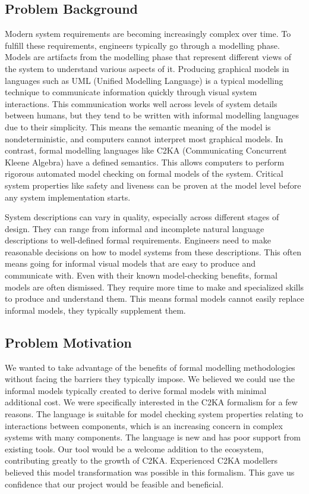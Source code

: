 \subsection{Problem Background}\label{subsec:problem-background}
Modern system requirements are becoming increasingly complex over time.
To fulfill these requirements, engineers typically go through a modelling phase.
Models are artifacts from the modelling phase that represent different views of the system to understand various aspects of it.
Producing graphical models in languages such as UML (Unified Modelling Language) is a typical modelling technique to communicate information quickly through visual system interactions.
This communication works well across levels of system details between humans,
but they tend to be written with informal modelling languages due to their simplicity.
This means the semantic meaning of the model is nondeterministic, and computers cannot interpret most graphical models.
In contrast, formal modelling languages like C2KA (Communicating Concurrent Kleene Algebra) have a defined semantics.
This allows computers to perform rigorous automated model checking on formal models of the system.
Critical system properties like safety and liveness can be proven at the model level before any system implementation starts.

System descriptions can vary in quality, especially across different stages of design.
They can range from informal and incomplete natural language descriptions
to well-defined formal requirements.
Engineers need to make reasonable decisions on how to model systems from these descriptions.
This often means going for informal visual models that are easy to produce and communicate with.
Even with their known model-checking benefits, formal models are often dismissed.
They require more time to make and specialized skills to produce and understand them.
This means formal models cannot easily replace informal models, they typically supplement them.

\subsection{Problem Motivation}\label{subsec:problem-motivation}
We wanted to take advantage of the benefits of formal modelling methodologies without facing the barriers they typically impose.
We believed we could use the informal models typically created to derive formal models with minimal additional cost.
We were specifically interested in the C2KA formalism for a few reasons.
The language is suitable for model checking system properties relating to interactions between components, which is an increasing concern in complex systems with many components.
The language is new and has poor support from existing tools.
Our tool would be a welcome addition to the ecosystem, contributing greatly to the growth of C2KA.
Experienced C2KA modellers believed this model transformation was possible in this formalism.
This gave us confidence that our project would be feasible and beneficial.

